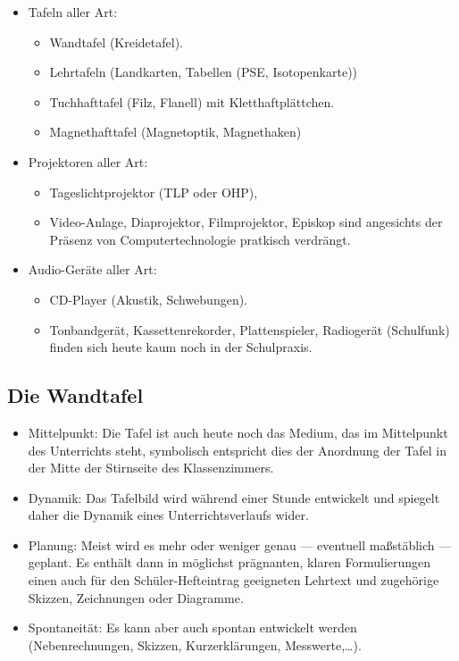 \begin{itemize}
\item
Tafeln aller Art:
\begin{itemize}
\item
Wandtafel (Kreidetafel).
\item
Lehrtafeln (Landkarten, Tabellen (PSE, Isotopen\-karte))
\item
Tuch\-hafttafel (Filz, Flanell) mit Kletthaftpl\"{a}ttchen.
\item
Magnet\-haft\-ta\-fel (Magnet\-optik, Magnet\-haken)
\end{itemize}

\item
Projektoren aller Art:
\begin{itemize}
\item
Tageslichtprojektor (TLP oder OHP),
\item
Video-Anlage, Diaprojektor, Filmprojektor, Episkop sind angesichts der Pr\"{a}senz von Computertechnologie pratkisch verdr\"{a}ngt. \end{itemize}
\item
Audio-Ger\"{a}te aller Art:
\begin{itemize}
\item
CD-Player (Akustik, Schwebungen).
\item
Tonbandger\"{a}t, Kassettenrekorder, Plattenspieler, Radioger\"{a}t (Schulfunk) finden sich heute kaum noch in der Schulpraxis.
\end{itemize}
\end{itemize}


\subsection{Die Wandtafel}
\begin{itemize}
\item Mittelpunkt: Die Tafel ist auch heute noch das Medium, das im
Mittelpunkt des Unterrichts steht,
symbolisch entspricht dies der Anordnung der Tafel in
der Mitte der Stirnseite des Klassenzimmers.

\item Dynamik: Das Tafelbild wird w\"{a}hrend einer Stunde entwickelt
und spiegelt daher die Dynamik eines Unterrichts\-verlaufs wider.

\item Planung: Meist wird es mehr oder weniger genau --- eventuell
ma{\ss}st\"{a}blich --- geplant.
Es enth\"{a}lt dann in m\"{o}glichst pr\"{a}gnanten, klaren Formulierungen einen
auch f\"{u}r den Sch\"{u}ler-Hefteintrag geeigneten Lehrtext
und zugeh\"{o}rige Skizzen, Zeichnungen oder Diagramme.

\item Spontaneit\"{a}t: Es kann aber auch spontan entwickelt werden
(Nebenrechnungen, Skizzen, Kurzerkl\"{a}rungen, Messwerte,\dots).
\end{itemize}

